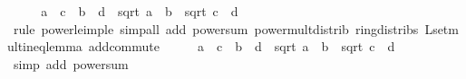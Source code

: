 \begin{isabellebody}
%
\isadelimproof
%
\endisadelimproof
%
\isatagproof
{}\isamarkupfalse%
\ {\isacharminus}{\kern0pt}\isanewline
\ \ \isamarkupfalse%
\ {\isachardoublequoteopen}{\isacharparenleft}{\kern0pt}a\ {\isacharasterisk}{\kern0pt}\ c\ {\isacharplus}{\kern0pt}\ b\ {\isacharasterisk}{\kern0pt}\ d{\isacharparenright}{\kern0pt}\ {\isasymle}\ {\isacharparenleft}{\kern0pt}sqrt\ {\isacharparenleft}{\kern0pt}a\ {\isacharplus}{\kern0pt}\ b\ {\isacharasterisk}{\kern0pt}\ sqrt\ {\isacharparenleft}{\kern0pt}c\ {\isacharplus}{\kern0pt}\ d\isanewline
\ \ \ \ \isamarkupfalse%
\ {\isacharparenleft}{\kern0pt}rule\ power{}{\isacharunderscore}{\kern0pt}le{\isacharunderscore}{\kern0pt}imp{\isacharunderscore}{\kern0pt}le{\isacharparenright}{\kern0pt}\ {\isacharparenleft}{\kern0pt}simp{\isacharunderscore}{\kern0pt}all\ add{\isacharcolon}{\kern0pt}\ power{}{\isacharunderscore}{\kern0pt}sum\ power{\isacharunderscore}{\kern0pt}mult{\isacharunderscore}{\kern0pt}distrib\ ring{\isacharunderscore}{\kern0pt}distribs\ L{}{\isacharunderscore}{\kern0pt}set{\isacharunderscore}{\kern0pt}mult{\isacharunderscore}{\kern0pt}ineq{\isacharunderscore}{\kern0pt}lemma\ add{\isachardot}{\kern0pt}commute{\isacharparenright}{\kern0pt}\isanewline
\ \ \isamarkupfalse%
\ \isamarkupfalse%
\ {\isachardoublequoteopen}{\isacharparenleft}{\kern0pt}a\ {\isacharplus}{\kern0pt}\ c{\isacharparenright}{\kern0pt}\ {\isacharplus}{\kern0pt}\ {\isacharparenleft}{\kern0pt}b\ {\isacharplus}{\kern0pt}\ d{\isacharparenright}{\kern0pt}\ {\isasymle}\ {\isacharparenleft}{\kern0pt}sqrt\ {\isacharparenleft}{\kern0pt}a\ {\isacharplus}{\kern0pt}\ b\ {\isacharplus}{\kern0pt}\ sqrt\ {\isacharparenleft}{\kern0pt}c\ {\isacharplus}{\kern0pt}\ d\isanewline
\ \ \ \ \isamarkupfalse%
\ {\isacharparenleft}{\kern0pt}simp\ add{\isacharcolon}{\kern0pt}\ power{}{\isacharunderscore}{\kern0pt}sum{\isacharparenright}{\kern0pt}\isanewline
\ \ \isamarkupfalse%
\ \isamarkupfalse%

\end{isabellebody}
